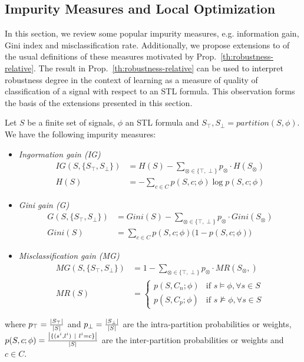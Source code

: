 \subsection{Impurity Measures and Local Optimization}
\label{sec:impurity}

In this section, we review some popular impurity measures,
e.g. information gain, Gini index and misclassification rate.
Additionally, we propose extensions to of the usual definitions
of these measures motivated by Prop.~\ref{th:robustness-relative}.
The result in Prop.~\ref{th:robustness-relative} can be used
to interpret robustness degree in the context of learning as a
measure of quality of classification of a signal with respect to
an STL formula. This observation forms the basis of the
extensions presented in this section.

\begin{definition}
\label{def:impurity}
Let $S$ be a finite set of signals, $\phi$ an STL formula and
$S_\top, S_\perp = partition(S, \phi)$. We have the
following impurity measures:
\begin{itemize}
  \item {\it Ingormation gain (IG)}
  {\scriptsize
  \begin{align}
  IG(S, \{S_\top, S_\perp\}) &= H(S) - \sum_{\otimes \in \{\top, \perp\}}p_\otimes\cdot H(S_\otimes)\\
  H(S) &= -\sum_{c \in C} p(S, c; \phi) \log p(S, c; \phi)
  \end{align}}%
  \item {\it Gini gain (G)}
  {\scriptsize
  \begin{align}
  G(S, \{S_\top, S_\perp\}) &= Gini(S) - \sum_{\otimes \in \{\top, \perp\}}p_\otimes\cdot Gini(S_\otimes)\\
  Gini(S) &= \sum_{c \in C} p(S, c; \phi) \big(1 - p(S, c; \phi)\big)
  \end{align}}%
  \item {\it Misclassification gain (MG)}
  {\scriptsize
  \begin{align}
  MG(S, \{S_\top, S_\perp\}) &= 1 - \sum_{\otimes \in \{\top, \perp\}}p_\otimes\cdot MR(S_\otimes,)\\
  MR(S) &= \begin{cases}
    p(S, C_n; \phi) & \text{if } s\models \phi, \forall s\in S\\
    p(S, C_p; \phi) & \text{if } s\not\models \phi, \forall s\in S
  \end{cases}
  \end{align}}%
\end{itemize}
where $p_\top = \frac{\left| {S_\top} \right|}{\left| {S} \right|}$ and
$p_\perp = \frac{\left| {S_\perp} \right|}{\left| {S} \right|}$ are the
intra-partition probabilities or weights,
$p(S, c;\phi)=\frac{\left| {\{(s^i, l^i)\ |\ l^i=c \}} \right|}{\left| {S} \right|}$
are the inter-partition probabilities or weights and $c \in C$.
\end{definition}

